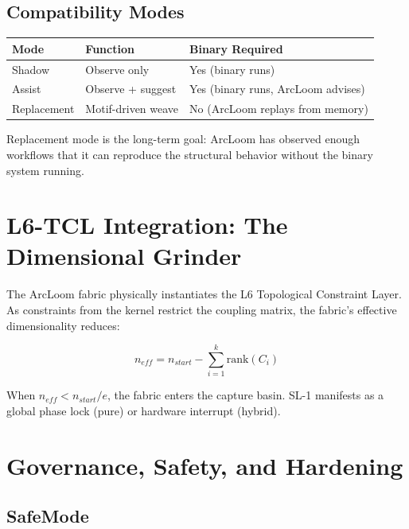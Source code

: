 \documentclass[11pt, a4paper]{report}
\begin{document}
\section{Compatibility Modes}

\begin{center}
\begin{tabular}{@{}lll@{}}
\toprule
\textbf{Mode} & \textbf{Function} & \textbf{Binary Required} \\
\midrule
Shadow & Observe only & Yes (binary runs) \\
Assist & Observe + suggest & Yes (binary runs, ArcLoom advises) \\
Replacement & Motif-driven weave & No (ArcLoom replays from memory) \\
\bottomrule
\end{tabular}
\end{center}

Replacement mode is the long-term goal: ArcLoom has observed enough
workflows that it can reproduce the structural behavior without the
binary system running.

\chapter{L6-TCL Integration: The Dimensional Grinder}

The ArcLoom fabric physically instantiates the L6 Topological Constraint
Layer. As constraints from the kernel restrict the coupling matrix, the
fabric's effective dimensionality reduces:

\begin{equation}
  n_{eff} = n_{start} - \sum_{i=1}^{k} \text{rank}(C_i)
\end{equation}

When $n_{eff} < n_{start}/e$, the fabric enters the capture basin.
SL-1 manifests as a global phase lock (pure) or hardware interrupt (hybrid).

\chapter{Governance, Safety, and Hardening}

\section{SafeMode}
\end{document}
